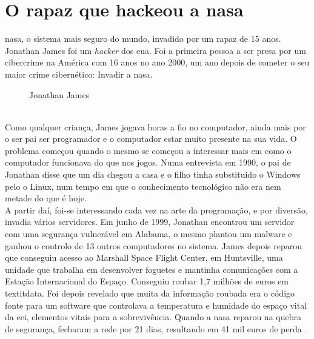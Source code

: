 \documentclass{report}
\begin{document}
\section{O rapaz que hackeou a \ac{nasa}}
\ac{nasa}, o sistema mais seguro do mundo, invadido por um rapaz de 15 anos. Jonathan James foi um \textit{hacker} dos \ac{eua}. Foi a primeira pessoa a ser presa por um cibercrime na América com 16 anos no ano 2000, um ano depois de cometer o seu maior crime cibernético: Invadir a \ac{nasa}. \\
\begin{figure}[h!]
    \center
    \caption{Jonathan James}
    \label{jonathanjames}
\end{figure}
\\
Como qualquer criança, James jogava horas a fio no computador, ainda mais por o ser pai ser programador e o computador estar muito presente na sua vida. O problema começou quando o mesmo se começou a interessar mais em como o computador funcionava do que nos jogos. Numa entrevista em 1990, o pai de Jonathan disse que um dia chegou a casa e o filho tinha substituido o Windows pelo o Linux, num tempo em que o conhecimento tecnológico não era nem metade do que é hoje. \\ \indent A partir daí, foi-se interessando cada vez na arte da programação, e por diversão, invadia vários servidores. Em junho de 1999, Jonathan encontrou um servidor com uma segurança vulnerável em Alabama, o mesmo plantou um malware e ganhou o controlo de 13 outros computadores no sistema. James depois reparou que conseguiu acesso ao Marshall Space Flight Center, em Huntsville, uma unidade que trabalha em desenvolver foguetes e mantinha comunicações com a Estação Internacional do Espaço. Conseguiu roubar 1,7 milhões de euros em textit{data}. Foi depois revelado que muita da informação roubada era o código fonte para um software que controlava a temperatura e humidade do espaço vital da \ac{eei}, elementos vitais para a sobrevivência. Quando a \ac{nasa} reparou na quebra de segurança, fecharam a rede por 21 dias, resultando em 41 mil euros de perda \cite{desconhecido}. 
\end{document}
